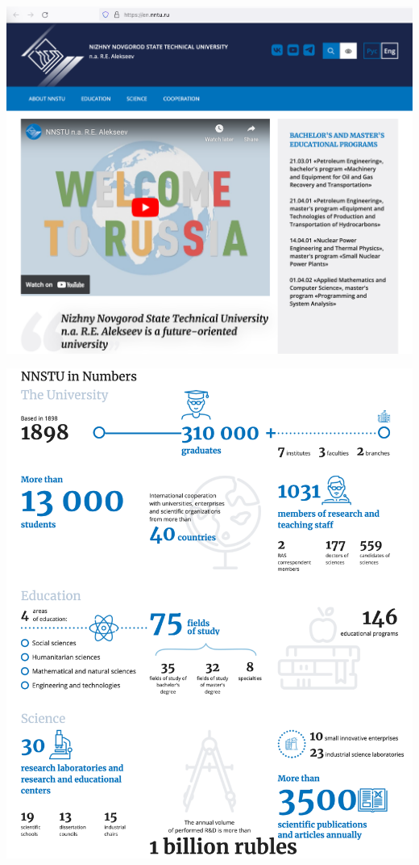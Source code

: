 
\includegraphics[width=\textwidth]{nntu-home-p1}
\WillContinue

\pagebreak

\Continuing
\includegraphics[width=\textwidth]{nntu-home-p2}

\pagebreak
